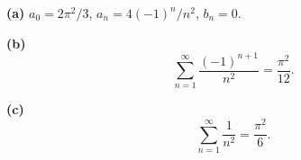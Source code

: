 \noindent\textbf{(a)} \(a_0=2\pi^2/3\), \(a_n=4(-1)^n/n^2\), \(b_n=0\).

\noindent\textbf{(b)} \[\sum_{n=1}^{\infty}\frac{(-1)^{n+1}}{n^2}=\frac{\pi^2}{12}.\]

\noindent\textbf{(c)} \[\sum_{n=1}^{\infty}\frac1{n^2}=\frac{\pi^2}{6}.\]
